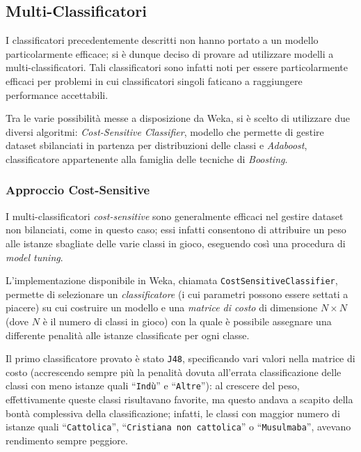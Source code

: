 \documentclass[a4paper,11pt,twoside,notitlepage,final]{scrartcl}
\begin{document}
\subsection{Multi-Classificatori}

I classificatori precedentemente descritti non hanno portato a un modello particolarmente efficace;
si è dunque deciso di provare ad utilizzare modelli a multi-classificatori.
Tali classificatori sono infatti noti per essere particolarmente efficaci per problemi in cui classificatori singoli faticano a raggiungere performance accettabili.

Tra le varie possibilità messe a disposizione da Weka, si è scelto di utilizzare due diversi algoritmi:
\emph{Cost-Sensitive Classifier}, modello che permette di gestire dataset sbilanciati in partenza per distribuzioni delle classi e \emph{Adaboost}, classificatore appartenente alla famiglia delle tecniche di \emph{Boosting}.

\subsubsection{Approccio Cost-Sensitive}

I multi-classificatori \emph{cost-sensitive} sono generalmente efficaci nel gestire dataset non bilanciati, come in questo caso;
essi infatti consentono di attribuire un peso alle istanze sbagliate delle varie classi in gioco, eseguendo così una procedura di \emph{model tuning}.

L'implementazione disponibile in Weka, chiamata \texttt{CostSensitiveClassifier},
permette di selezionare un \emph{classificatore} (i cui parametri possono essere settati a piacere) su cui costruire un modello
e una \emph{matrice di costo} di dimensione \(N×N\) (dove \(N\) è il numero di classi in gioco) con la quale è possibile assegnare una differente penalità alle istanze classificate per ogni classe.

Il primo classificatore provato è stato \texttt{J48}, specificando vari valori nella matrice di costo (accrescendo sempre più la penalità dovuta all'errata classificazione delle classi con meno istanze quali ``\texttt{Indù}'' e ``\texttt{Altre}''):
al crescere del peso, effettivamente queste classi risultavano favorite, ma questo andava a scapito della bontà complessiva della classificazione; infatti, le classi con maggior numero di istanze quali ``\texttt{Cattolica}'', ``\texttt{Cristiana non cattolica}'' o ``\texttt{Musulmaba}'', avevano rendimento sempre peggiore.
\end{document}

